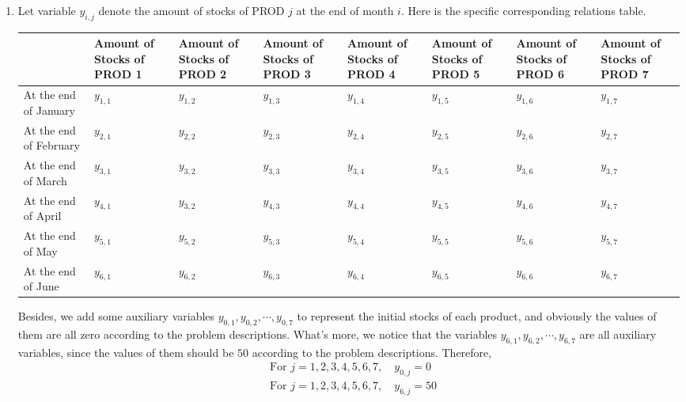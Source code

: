 \documentclass[12pt,a4paper]{article}
\makeatletter
\newtheorem*{solution}{Solution}
\theoremstyle{definition}
\renewenvironment{solution}[1][Solution] {\par\pushQED{\qed}\normalfont\topsep6\p@\@plus6\p@\relax\trivlist\item[\hskip\labelsep\bfseries#1\@addpunct{.}]\ignorespaces}{\popQED\endtrivlist\@endpefalse} \makeatother
\makeatother
\begin{document}
\begin{enumerate}
\begin{solution}
\begin{enumerate}
        Let variable $y_{i,j}$ denote the amount of stocks of PROD $j$ at the end of month $i$. Here is the specific corresponding relations table.
        \begin{table}[htbp]
    		\scriptsize
    		\centering
    		\renewcommand\arraystretch{1.1}
    		\begin{tabular}{m{} m{}<{\centering} m{}<{\centering} m{}<{\centering} m{}<{\centering} m{}<{\centering} m{}<{\centering} m{}<{\centering}}
    			\hline
    			& \textbf{Amount of Stocks of PROD 1} & \textbf{Amount of Stocks of PROD 2} & \textbf{Amount of Stocks of PROD 3} & \textbf{Amount of Stocks of PROD 4} & \textbf{Amount of Stocks of PROD 5} & \textbf{Amount of Stocks of PROD 6} &  \textbf{Amount of Stocks of PROD 7} \\\hline
    			At the end of January & $y_{1,1}$ & $y_{1,2}$ & $y_{1,3}$ & $y_{1,4}$ & $y_{1,5}$ & $y_{1,6}$ & $y_{1,7}$ \\
    			At the end of February & $y_{2,1}$ & $y_{2,2}$ & $y_{2,3}$ & $y_{2,4}$ & $y_{2,5}$ & $y_{2,6}$ & $y_{2,7}$ \\
    			At the end of March & $y_{3,1}$ & $y_{3,2}$ & $y_{3,3}$ & $y_{3,4}$ & $y_{3,5}$ & $y_{3,6}$ & $y_{3,7}$ \\
    			At the end of April & $y_{4,1}$ & $y_{3,2}$ & $y_{4,3}$ & $y_{4,4}$ & $y_{4,5}$ & $y_{4,6}$ & $y_{4,7}$ \\
    			At the end of May & $y_{5,1}$ & $y_{5,2}$ & $y_{5,3}$ & $y_{5,4}$ & $y_{5,5}$ & $y_{5,6}$ & $y_{5,7}$ \\
    			At the end of June & $y_{6,1}$ & $y_{6,2}$ & $y_{6,3}$ & $y_{6,4}$ & $y_{6,5}$ & $y_{6,6}$ & $y_{6,7}$ \\
    			\hline
    		\end{tabular}
    	\end{table}

        Besides, we add some auxiliary variables $y_{0,1}, y_{0,2}, \cdots, y_{0,7}$ to represent the initial stocks of each product, and obviously the values of them are all zero according to the problem descriptions. What's more, we notice that the variables $y_{6,1}, y_{6,2}, \cdots, y_{6,7}$ are all auxiliary variables, since the values of them should be $50$ according to the problem descriptions. Therefore,
        \begin{equation}
        \begin{aligned}
        &\textrm{For\ } j = 1,2,3,4,5,6,7, \quad y_{0,j} = 0 \\
        &\textrm{For\ } j = 1,2,3,4,5,6,7, \quad y_{6,j} = 50
        \end{aligned}
        \label{rest1}
        \end{equation}


\end{enumerate}
\end{solution}
\end{enumerate}
\end{document}

